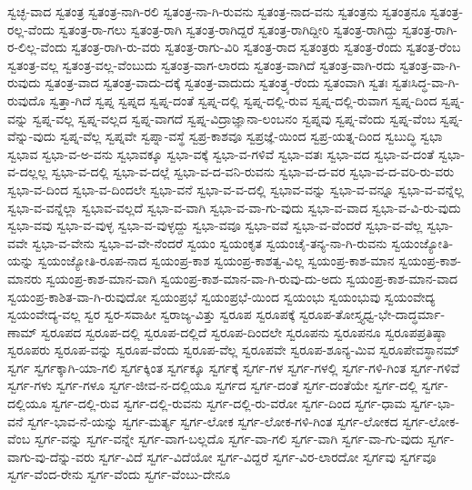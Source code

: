 {ಸ್ವಚ್ಛ-ವಾದ
ಸ್ವತಂತ್ರ
ಸ್ವತಂತ್ರ-ನಾಗಿ-ರಲಿ
ಸ್ವತಂತ್ರ-ನಾ-ಗಿ-ರುವನು
ಸ್ವತಂತ್ರ-ನಾದ-ವನು
ಸ್ವತಂತ್ರನು
ಸ್ವತಂತ್ರನೂ
ಸ್ವತಂತ್ರ-ರಲ್ಲ-ವೆಂದು
ಸ್ವತಂತ್ರ-ರಾ-ಗಲು
ಸ್ವತಂತ್ರ-ರಾಗಿ
ಸ್ವತಂತ್ರ-ರಾಗಿದ್ದರೆ
ಸ್ವತಂತ್ರ-ರಾಗಿದ್ದೀರಿ
ಸ್ವತಂತ್ರ-ರಾಗಿದ್ದು
ಸ್ವತಂತ್ರ-ರಾಗಿ-ರ-ಲಿಲ್ಲ-ವೆಂದು
ಸ್ವತಂತ್ರ-ರಾಗಿ-ರು-ವರು
ಸ್ವತಂತ್ರ-ರಾಗು-ವಿರಿ
ಸ್ವತಂತ್ರ-ರಾದ
ಸ್ವತಂತ್ರರು
ಸ್ವತಂತ್ರ-ರೆಂದು
ಸ್ವತಂತ್ರ-ರೆಂಬ
ಸ್ವತಂತ್ರ-ವಲ್ಲ
ಸ್ವತಂತ್ರ-ವಲ್ಲ-ವೆಂಬುದು
ಸ್ವತಂತ್ರ-ವಾಗ-ಲಾರದು
ಸ್ವತಂತ್ರ-ವಾಗಿದೆ
ಸ್ವತಂತ್ರ-ವಾಗಿ-ರದು
ಸ್ವತಂತ್ರ-ವಾ-ಗಿ-ರುವುದು
ಸ್ವತಂತ್ರ-ವಾದ
ಸ್ವತಂತ್ರ-ವಾದು-ದಕ್ಕೆ
ಸ್ವತಂತ್ರ-ವಾದುದು
ಸ್ವತಂತ್ರ್ಯ-ರೆಂದು
ಸ್ವತಂವಾಗಿ
ಸ್ವತಃ
ಸ್ವತಃಸಿದ್ಧ-ವಾ-ಗಿ-ರುವುದೊ
ಸ್ವತ್ತಾ-ಗಿದೆ
ಸ್ವಪ್ನ
ಸ್ವಪ್ನದ
ಸ್ವಪ್ನ-ದಂತೆ
ಸ್ವಪ್ನ-ದಲ್ಲಿ
ಸ್ವಪ್ನ-ದಲ್ಲಿ-ರುವ
ಸ್ವಪ್ನ-ದಲ್ಲಿ-ರುವಾಗ
ಸ್ವಪ್ನ-ದಿಂದ
ಸ್ವಪ್ನ-ವನ್ನು
ಸ್ವಪ್ನ-ವಲ್ಲ
ಸ್ವಪ್ನ-ವಲ್ಲದ
ಸ್ವಪ್ನ-ವಾಗದೆ
ಸ್ವಪ್ನ-ವಿದ್ರಾಜ್ಞಾನಾ-ಲಂಬನಂ
ಸ್ವಪ್ನವು
ಸ್ವಪ್ನ-ವೆಂದು
ಸ್ವಪ್ನ-ವೆಂಬ
ಸ್ವಪ್ನ-ವೆನ್ನು-ವುದು
ಸ್ವಪ್ನ-ವೆಲ್ಲ
ಸ್ವಪ್ನವೇ
ಸ್ವಪ್ನಾ-ವಸ್ಥೆ
ಸ್ವಪ್ರ-ಕಾಶವೂ
ಸ್ವಪ್ರಜ್ಞೆ-ಯಿಂದ
ಸ್ವಪ್ರ-ಯತ್ನ-ದಿಂದ
ಸ್ವಬುದ್ಧಿ
ಸ್ವಭಾ
ಸ್ವಭಾವ
ಸ್ವಭಾ-ವ-ಅ-ವನು
ಸ್ವಭಾವಕ್ಕೂ
ಸ್ವಭಾ-ವಕ್ಕೆ
ಸ್ವಭಾ-ವ-ಗಳಿವೆ
ಸ್ವಭಾ-ವತಃ
ಸ್ವಭಾ-ವದ
ಸ್ವಭಾ-ವ-ದಂತೆ
ಸ್ವಭಾ-ವ-ದಲ್ಲಲ್ಲ
ಸ್ವಭಾ-ವ-ದಲ್ಲಿ
ಸ್ವಭಾ-ವ-ದಲ್ಲೆ
ಸ್ವಭಾ-ವ-ದ-ವನಿ-ರುವನು
ಸ್ವಭಾ-ವ-ದ-ವರ
ಸ್ವಭಾ-ವ-ದ-ವರಿ-ರು-ವರು
ಸ್ವಭಾ-ವ-ದಿಂದ
ಸ್ವಭಾ-ವ-ದಿಂದಲೇ
ಸ್ವಭಾ-ವನೆ
ಸ್ವಭಾ-ವ-ವ-ದಲ್ಲಿ
ಸ್ವಭಾವ-ವನ್ನು
ಸ್ವಭಾ-ವ-ವನ್ನೂ
ಸ್ವಭಾ-ವ-ವನ್ನೆಲ್ಲ
ಸ್ವಭಾ-ವ-ವನ್ನೆಲ್ಲಾ
ಸ್ವಭಾವ-ವಲ್ಲದೆ
ಸ್ವಭಾ-ವ-ವಾಗಿ
ಸ್ವಭಾ-ವ-ವಾ-ಗು-ವುದು
ಸ್ವಭಾ-ವ-ವಾದ
ಸ್ವಭಾ-ವ-ವಿ-ರು-ವುದು
ಸ್ವಭಾ-ವವು
ಸ್ವಭಾ-ವ-ವುಳ್ಳ
ಸ್ವಭಾ-ವ-ವುಳ್ಳದ್ದು
ಸ್ವಭಾ-ವವೂ
ಸ್ವಭಾ-ವವೆ
ಸ್ವಭಾ-ವ-ವೆಂದರೆ
ಸ್ವಭಾ-ವ-ವೆಲ್ಲ
ಸ್ವಭಾ-ವವೇ
ಸ್ವಭಾ-ವ-ವೇನು
ಸ್ವಭಾ-ವ-ವೇ-ನೆಂದರೆ
ಸ್ವಯಂ
ಸ್ವಯಂಕೃತ
ಸ್ವಯಂಚೈ-ತನ್ಯ-ನಾ-ಗಿ-ರುವನು
ಸ್ವಯಂಜ್ಯೋತಿ-ಯನ್ನು
ಸ್ವಯಂಜ್ಯೋತಿ-ರೂಪ-ನಾದ
ಸ್ವಯಂಪ್ರ-ಕಾಶ
ಸ್ವಯಂಪ್ರ-ಕಾಶತ್ವ-ವಿಲ್ಲ
ಸ್ವಯಂಪ್ರ-ಕಾಶ-ಮಾನ
ಸ್ವಯಂಪ್ರ-ಕಾಶ-ಮಾನರು
ಸ್ವಯಂಪ್ರ-ಕಾಶ-ಮಾನ-ವಾಗಿ
ಸ್ವಯಂಪ್ರ-ಕಾಶ-ಮಾನ-ವಾ-ಗಿ-ರುವು-ದು-ಅದು
ಸ್ವಯಂಪ್ರ-ಕಾಶ-ಮಾನ-ವಾದ
ಸ್ವಯಂಪ್ರ-ಕಾಶಿತ-ವಾ-ಗಿ-ರುವುದೋ
ಸ್ವಯಂಪ್ರಭೆ
ಸ್ವಯಂಪ್ರಭೆ-ಯಿಂದ
ಸ್ವಯಂಭು
ಸ್ವಯಂಭುವು
ಸ್ವಯಂವೇದ್ಯ
ಸ್ವಯಂವೇದ್ಯ-ವಲ್ಲ
ಸ್ವರ
ಸ್ವರ-ಸವಾಹೀ
ಸ್ವರಾಜ್ಯ-ವಿತ್ತು
ಸ್ವರೂಪ
ಸ್ವರೂಪಕ್ಕೆ
ಸ್ವರೂಪ-ತೋಸ್ತ್ಯಧ್ವ-ಭೇ-ದಾದ್ಧರ್ಮಾ-ಣಾಮ್
ಸ್ವರೂಪದ
ಸ್ವರೂಪ-ದಲ್ಲಿ
ಸ್ವರೂಪ-ದಲ್ಲಿದೆ
ಸ್ವರೂಪ-ದಿಂದಲೇ
ಸ್ವರೂಪನು
ಸ್ವರೂಪನೂ
ಸ್ವರೂಪಪ್ರತಿಷ್ಠಾ
ಸ್ವರೂಪರು
ಸ್ವರೂಪ-ವನ್ನು
ಸ್ವರೂಪ-ವೆಂದು
ಸ್ವರೂಪ-ವೆಲ್ಲ
ಸ್ವರೂಪವೇ
ಸ್ವರೂಪ-ಶೂನ್ಯ-ಮಿವ
ಸ್ವರೂಪೇವಸ್ಥಾನಮ್
ಸ್ವರ್ಗ
ಸ್ವರ್ಗಕ್ಕಾಗಿ-ಯಾ-ಗಲಿ
ಸ್ವರ್ಗಕ್ಕಿಂತ
ಸ್ವರ್ಗಕ್ಕೂ
ಸ್ವರ್ಗಕ್ಕೆ
ಸ್ವರ್ಗ-ಗಳ
ಸ್ವರ್ಗ-ಗಳಲ್ಲಿ
ಸ್ವರ್ಗ-ಗಳಿ-ಗಿಂತ
ಸ್ವರ್ಗ-ಗಳಿವೆ
ಸ್ವರ್ಗ-ಗಳು
ಸ್ವರ್ಗ-ಗಳೂ
ಸ್ವರ್ಗ-ಜೀವ-ನ-ದಲ್ಲಿಯೂ
ಸ್ವರ್ಗದ
ಸ್ವರ್ಗ-ದಂತೆ
ಸ್ವರ್ಗ-ದಂತೆಯೇ
ಸ್ವರ್ಗ-ದಲ್ಲಿ
ಸ್ವರ್ಗ-ದಲ್ಲಿಯೂ
ಸ್ವರ್ಗ-ದಲ್ಲಿ-ರುವ
ಸ್ವರ್ಗ-ದಲ್ಲಿ-ರುವನು
ಸ್ವರ್ಗ-ದಲ್ಲಿ-ರು-ವರೋ
ಸ್ವರ್ಗ-ದಿಂದ
ಸ್ವರ್ಗ-ಧಾಮ
ಸ್ವರ್ಗ-ಭಾ-ವನೆ
ಸ್ವರ್ಗ-ಭಾವ-ನೆ-ಯನ್ನು
ಸ್ವರ್ಗ-ಮರ್ತ್ಯ
ಸ್ವರ್ಗ-ಲೋಕ
ಸ್ವರ್ಗ-ಲೋಕ-ಗಳಿ-ಗಿಂತ
ಸ್ವರ್ಗ-ಲೋಕದ
ಸ್ವರ್ಗ-ಲೋಕ-ವೆಂಬ
ಸ್ವರ್ಗ-ವನ್ನು
ಸ್ವರ್ಗ-ವನ್ನೇ
ಸ್ವರ್ಗ-ವಾಗ-ಬಲ್ಲದೊ
ಸ್ವರ್ಗ-ವಾ-ಗಲಿ
ಸ್ವರ್ಗ-ವಾಗಿ
ಸ್ವರ್ಗ-ವಾ-ಗು-ವುದು
ಸ್ವರ್ಗ-ವಾಗು-ವು-ದೆನ್ನು-ವರು
ಸ್ವರ್ಗ-ವಿದೆ
ಸ್ವರ್ಗ-ವಿದೆಯೋ
ಸ್ವರ್ಗ-ವಿದ್ದರೆ
ಸ್ವರ್ಗ-ವಿರ-ಲಾರದೋ
ಸ್ವರ್ಗವು
ಸ್ವರ್ಗವೂ
ಸ್ವರ್ಗ-ವೆಂದ-ರೇನು
ಸ್ವರ್ಗ-ವೆಂದು
ಸ್ವರ್ಗ-ವೆಂಬು-ದೇನೂ
}
